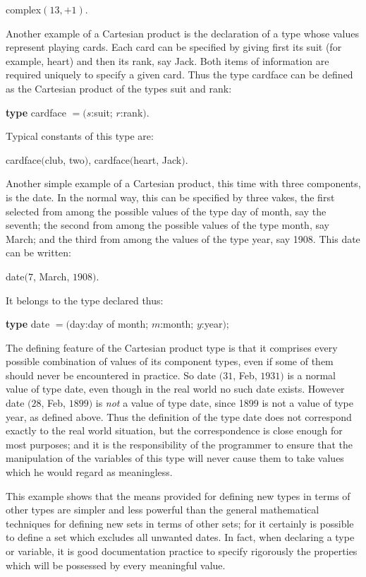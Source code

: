 \quad complex$(13, + 1)$.

\noindent
Another example of a Cartesian product is the declaration of a type whose values represent playing cards. Each card can be specified by giving first its suit (for example, heart) and then its rank, say Jack. Both items of information are required uniquely to specify a given card. Thus the type cardface can be defined as the Cartesian product of the types suit and rank:

\quad \textbf{type} cardface $= (s$:suit; $r$:rank$)$.

Typical constants of this type are:

\quad cardface$($club, two$)$, cardface$($heart, Jack$)$.

Another simple example of a Cartesian product, this time with three
components, is the date. In the normal way, this can be specified by three
vakes, the first selected from among the possible values of the type day of
month, say the seventh; the second from among the possible values of the
type month, say March; and the third from among the values of the type
year, say 1908. This date can be written:

\quad date$(7$, March, $1908)$.

\noindent
It belongs to the type declared thus:

\quad \textbf{type} date $= ($day:day of month; $m$:month; $y$:year$)$;

The defining feature of the Cartesian product type is that it comprises every possible combination of values of its component types, even if some of them should never be encountered in practice. So date $(31$, Feb, $1931)$ is a normal value of type date, even though in the real world no such date exists. However date $(28$, Feb, $1899)$ is \textit{not} a value of type date, since 1899 is not a value of type year, as defined above. Thus the definition of the type date does not correspond exactly to the real world situation, but the correspondence is close enough for most purposes; and it is the responsibility of the programmer to ensure that the manipulation of the variables of this type will never cause them to take values which he would regard as meaningless.

This example shows that the means provided for defining new types in terms of other types are simpler and less powerful than the general mathematical techniques for defining new sets in terms of other sets; for it certainly is possible to define a set which excludes all unwanted dates. In fact, when declaring a type or variable, it is good documentation practice to specify rigorously the properties which will be possessed by every meaningful value.
 

